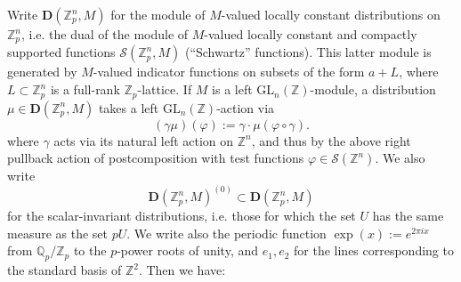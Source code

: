 \documentclass[10pt]{amsart}
\theoremstyle{definition}
\newcommand{\Z}{\mathbb{Z}}
\newcommand{\Q}{\mathbb{Q}}
\newcommand{\D}{\mathbf{D}}
\newcommand{\cS}{\mathcal{S}}
\numberwithin{equation}{section}
\begin{document}
    Write $\D(\mathbb{Z}_p^n,M)$ for the module of $M$-valued locally constant distributions on $\mathbb{Z}_p^n$, i.e. the dual of the module of $M$-valued locally constant and compactly supported functions $\cS(\mathbb{Z}_p^n,M)$ (``Schwartz'' functions). This latter module is generated by $M$-valued indicator functions on subsets of the form $a+L$, where $L\subset \mathbb{Z}_p^n$ is a full-rank $\mathbb{Z}_p$-lattice. If $M$ is a left $\mathrm{GL}_n(\mathbb{Z})$-module, a distribution $\mu\in\D(\mathbb{Z}^n_p,M)$ takes a left $\mathrm{GL}_n(\mathbb{Z})$-action via
    \[
    (\gamma \mu)(\varphi) := \gamma \cdot\mu( \varphi\circ \gamma).
    \]
    where $\gamma$ acts via its natural left action on $\mathbb{Z}^n$, and thus by the above right pullback action of postcomposition with test functions $\varphi\in \mathcal{S}(\Z^n)$. We also write 
    \[
    \D(\mathbb{Z}^n_p,M)^{(0)} \subset \D(\mathbb{Z}^n_p,M)
    \]
    for the scalar-invariant distributions, i.e. those for which the set $U$ has the same measure as the set $pU$. We write also the periodic function $\exp(x):=e^{2\pi i x}$ from $\Q_p/\Z_p$ to the $p$-power roots of unity, and $e_1,e_2$ for the lines corresponding to the standard basis of $\Z^2$. Then we have:
\end{document}
